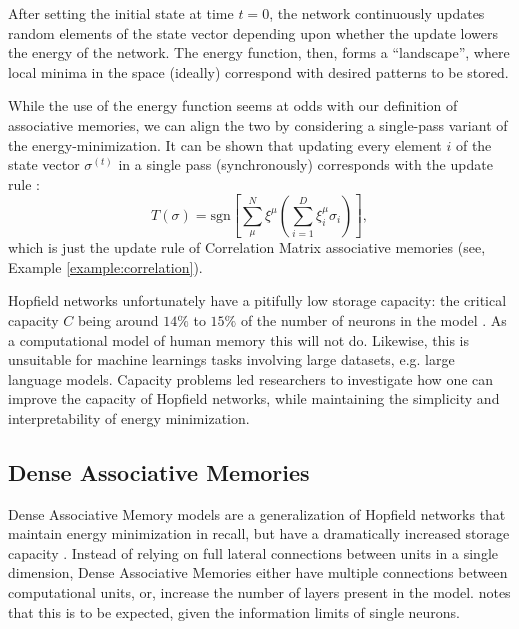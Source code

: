 \documentclass{article}
\theoremstyle{definition}
\begin{document}
After setting the initial state at time $t=0$, the network
continuously updates random
elements of the state vector depending upon whether the update lowers
the energy of the
network. The energy function, then, forms a ``landscape'', where
local minima in the space
(ideally) correspond with desired patterns to be stored.

While the use of the energy function seems at odds with our definition
of associative memories, we can align the two by considering a
single-pass variant of the energy-minimization. It can be shown
that updating every element $i$ of the state vector $\sigma^{(t)}$
in a single pass (synchronously) corresponds with the update rule
\parencite{krotov_modern_2025}:
\begin{equation}\label{eq:hopfield-sync}
  T(\sigma) = \text{sgn} \left[ \sum^N_\mu \xi^\mu \left(
  \sum^D_{i=1} \xi^\mu_i \sigma_i \right) \right],
\end{equation}
which is just the update rule of Correlation Matrix associative memories
(see, Example \ref{example:correlation}).

Hopfield networks unfortunately have a pitifully low
storage capacity: the critical capacity $C$ being around $14\%$ to $15\%$
of the number of neurons in the model
\parencites{amit_statistical_1987,hopfield_neural_1982}. As a computational
model of human memory this will not do.  %
Likewise, this is unsuitable for machine learnings tasks involving large
datasets, e.g. large language models. Capacity problems led researchers
to investigate how one can improve the capacity of Hopfield networks,
while maintaining the simplicity and interpretability of energy minimization.

\subsection{Dense Associative Memories}\label{sec:dense-associative-memory}

Dense Associative Memory models are a generalization of Hopfield networks that
maintain energy minimization in recall, but have a dramatically
increased storage capacity \parencite{krotov_dense_2016,demircigil_model_2017}.
Instead of relying on full lateral connections between units in a
single dimension,
Dense Associative Memories either have multiple connections between
computational units, or, increase the number of layers present in the model.
\textcite{krotov_large_2021} notes that this is to be expected, given the
information limits of single neurons.
\end{document}
